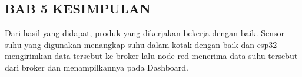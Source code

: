 \begin{center}
    \section*{BAB 5 KESIMPULAN}
\end{center}

\setcounter{section}{5}
\setcounter{subsection}{0}

Dari hasil yang didapat, produk yang dikerjakan bekerja dengan baik. Sensor suhu yang digunakan menangkap suhu dalam kotak dengan baik dan esp32 mengirimkan data tersebut ke broker lalu node-red menerima data suhu tersebut dari broker dan menampilkannya pada Dashboard.